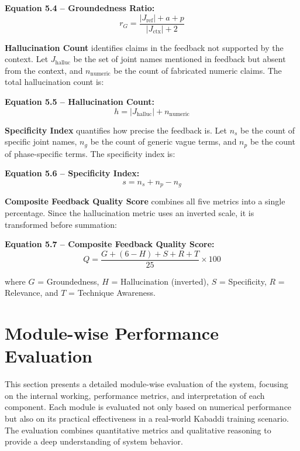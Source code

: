 \begin{sloppypar}
\textbf{Equation 5.4 -- Groundedness Ratio:}
\begin{equation}
r_G = \frac{|J_{\text{ref}}| + a + p}{|J_{\text{ctx}}| + 2}
\tag{5.4}
\end{equation}

\textbf{Hallucination Count} identifies claims in the feedback not supported by the context. Let $J_{\text{halluc}}$ be the set of joint names mentioned in feedback but absent from the context, and $n_{\text{numeric}}$ be the count of fabricated numeric claims. The total hallucination count is:

\textbf{Equation 5.5 -- Hallucination Count:}
\begin{equation}
h = |J_{\text{halluc}}| + n_{\text{numeric}}
\tag{5.5}
\end{equation}

\textbf{Specificity Index} quantifies how precise the feedback is. Let $n_s$ be the count of specific joint names, $n_g$ be the count of generic vague terms, and $n_p$ be the count of phase-specific terms. The specificity index is:

\textbf{Equation 5.6 -- Specificity Index:}
\begin{equation}
s = n_s + n_p - n_g
\tag{5.6}
\end{equation}

\textbf{Composite Feedback Quality Score} combines all five metrics into a single percentage. Since the hallucination metric uses an inverted scale, it is transformed before summation:

\textbf{Equation 5.7 -- Composite Feedback Quality Score:}
\begin{equation}
Q = \frac{G + (6 - H) + S + R + T}{25} \times 100
\tag{5.7}
\end{equation}

\noindent where $G$ = Groundedness, $H$ = Hallucination (inverted), $S$ = Specificity, $R$ = Relevance, and $T$ = Technique Awareness.


\section{Module-wise Performance Evaluation}

This section presents a detailed module-wise evaluation of the system, focusing on the internal working, performance metrics, and interpretation of each component. Each module is evaluated not only based on numerical performance but also on its practical effectiveness in a real-world Kabaddi training scenario. The evaluation combines quantitative metrics and qualitative reasoning to provide a deep understanding of system behavior.


\end{sloppypar}
